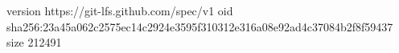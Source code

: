 version https://git-lfs.github.com/spec/v1
oid sha256:23a45a062c2575ec14c2924e3595f310312e316a08e92ad4c37084b2f8f59437
size 212491
